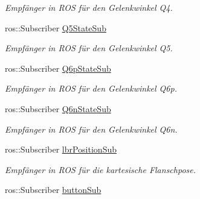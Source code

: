 \begin{DoxyCompactItemize}
\begin{DoxyCompactList}\small\item\em Empfänger in R\-O\-S für den Gelenkwinkel Q4. \end{DoxyCompactList}\item 
\hypertarget{classICommander_a1a7a812f85d4e474a206e44028c3d16d}{ros\-::\-Subscriber \hyperlink{classICommander_a1a7a812f85d4e474a206e44028c3d16d}{Q5\-State\-Sub}}\label{classICommander_a1a7a812f85d4e474a206e44028c3d16d}

\begin{DoxyCompactList}\small\item\em Empfänger in R\-O\-S für den Gelenkwinkel Q5. \end{DoxyCompactList}\item 
\hypertarget{classICommander_a67354975e870a8d2d5f419be68c16150}{ros\-::\-Subscriber \hyperlink{classICommander_a67354975e870a8d2d5f419be68c16150}{Q6p\-State\-Sub}}\label{classICommander_a67354975e870a8d2d5f419be68c16150}

\begin{DoxyCompactList}\small\item\em Empfänger in R\-O\-S für den Gelenkwinkel Q6p. \end{DoxyCompactList}\item 
\hypertarget{classICommander_a407e8cf738a603b645cf4065f25fe961}{ros\-::\-Subscriber \hyperlink{classICommander_a407e8cf738a603b645cf4065f25fe961}{Q6n\-State\-Sub}}\label{classICommander_a407e8cf738a603b645cf4065f25fe961}

\begin{DoxyCompactList}\small\item\em Empfänger in R\-O\-S für den Gelenkwinkel Q6n. \end{DoxyCompactList}\item 
\hypertarget{classICommander_aca2bb439e90e5197ac0a90c9b997cd35}{ros\-::\-Subscriber \hyperlink{classICommander_aca2bb439e90e5197ac0a90c9b997cd35}{lbr\-Position\-Sub}}\label{classICommander_aca2bb439e90e5197ac0a90c9b997cd35}

\begin{DoxyCompactList}\small\item\em Empfänger in R\-O\-S für die kartesische Flanschpose. \end{DoxyCompactList}\item 
\hypertarget{classICommander_a29cbc1faa4cb0346bdc26ca7bc4b5ba3}{ros\-::\-Subscriber \hyperlink{classICommander_a29cbc1faa4cb0346bdc26ca7bc4b5ba3}{button\-Sub}}\label{classICommander_a29cbc1faa4cb0346bdc26ca7bc4b5ba3}


\end{DoxyCompactItemize}
